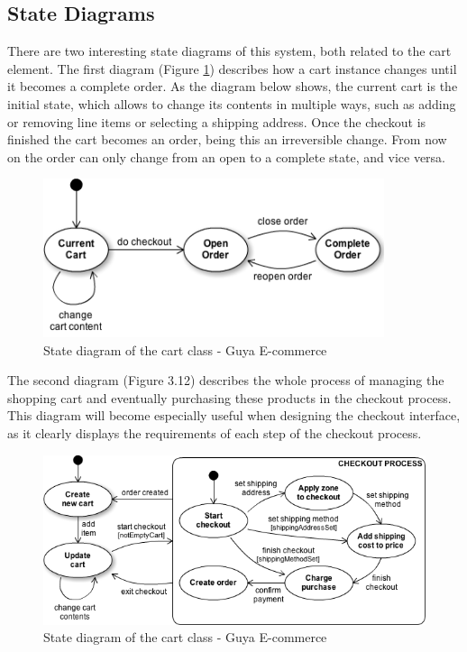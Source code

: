 \clearpage
  
\subsection{State Diagrams}
There are two interesting state diagrams of this system, both related to the cart element. The first diagram (Figure \ref{cart-state-diagram}) describes how a cart instance changes until it becomes a complete order. As the diagram below shows, the current cart is the initial state, which allows to change its contents in multiple ways, such as adding or removing line items or selecting a shipping address. Once the checkout is finished the cart becomes an order, being this an irreversible change. From now on the order can only change from an open to a complete state, and vice versa.

\begin{figure}[!h]
\center
\includegraphics[keepaspectratio, width=10cm]{state-diagrams/cart-state-diagram.png}
\caption{State diagram of the cart class - Guya E-commerce}
\label{cart-state-diagram}
\end{figure}

The second diagram (Figure 3.12) describes the whole process of managing the shopping cart and eventually purchasing these products in the checkout process. This diagram will become especially useful when designing the checkout interface, as it clearly displays the requirements of each step of the checkout process.

\begin{figure}[!h]
\center
\includegraphics[keepaspectratio, width=15cm]{state-diagrams/purchasing-product-state-diagram.png}
\caption{State diagram of the cart class - Guya E-commerce}
\label{purchasing-product-state-diagram}
\end{figure}

